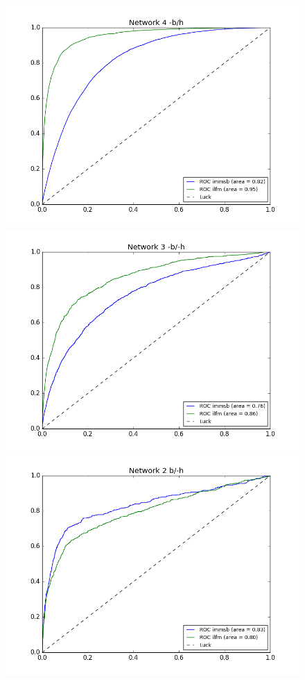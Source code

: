\begin{figure}[h]
	\centering
	
	\includegraphics[scale=0.22]{img/M_e/AUC-ROC/figure_1}
	\endminipage
	\includegraphics[scale=0.22]{img/M_e/AUC-ROC/figure_2}
	\endminipage
	\vspace{-0.4cm}
	\includegraphics[scale=0.22]{img/M_e/AUC-ROC/figure_3}

\end{figure}
